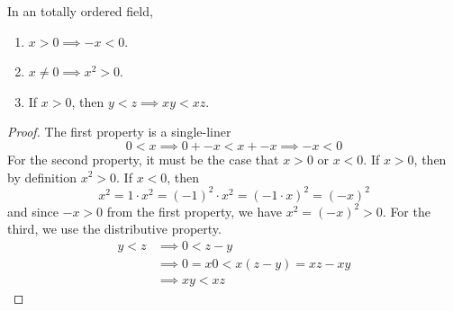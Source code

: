   \begin{theorem}[Properties]
    In an totally ordered field, 
    \begin{enumerate}
      \item $x > 0 \implies -x < 0$. 
      \item $x \neq 0 \implies x^2 > 0$. 
      \item If $x > 0$, then $y < z \implies xy < xz$. 
    \end{enumerate}
  \end{theorem} 
  \begin{proof}
    The first property is a single-liner 
    \begin{equation}
      0 < x \implies 0 + -x < x + -x \implies -x < 0 
    \end{equation}
    For the second property, it must be the case that $x > 0$ or $x < 0$. If $x > 0$, then by definition $x^2 > 0$. If $x < 0$, then 
    \begin{equation}
      x^2 = 1 \cdot x^2 = (-1)^2 \cdot x^2 = (-1 \cdot x)^2 = (-x)^2
    \end{equation}
    and since $-x > 0$ from the first property, we have $x^2 = (-x)^2 > 0$. For the third, we use the distributive property. 
    \begin{align}
      y < z & \implies 0 < z - y \\ 
            & \implies 0 = x 0 < x(z - y) = xz - xy \\
            & \implies xy < xz
    \end{align}
  \end{proof}

